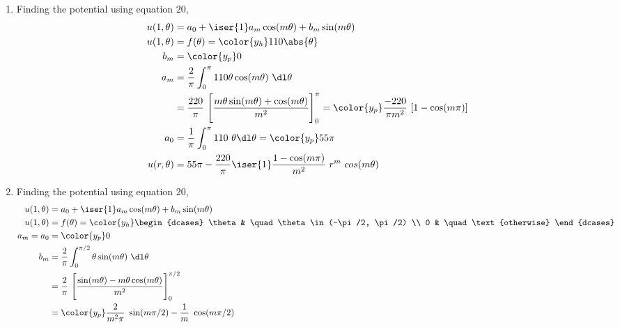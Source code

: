 \begin{enumerate}
    \item Finding the potential using equation $ 20 $,
          \begin{align}
              u(1, \theta) & = a_0 + \iser{1} a_m \cos(m\theta) + b_m \sin(m\theta)   \\
              u(1, \theta) & = f(\theta) = \color{y_h} 110\abs{\theta}                \\
              b_m          & = \color{y_p} 0                                          \\
              a_m          & = \frac{2}{\pi} \int_{0}^{\pi} 110 \theta \cos(m\theta)
              \ \dl \theta                                                            \\
                           & = \frac{220}{\pi}\ \Bigg[ \frac{m\theta \sin(m\theta)
                      + \cos(m\theta)}{m^2} \Bigg]_{0}^{\pi}
              = \color{y_p} \frac{-220}{\pi m^2}\ [1 - \cos(m\pi)]                    \\
              a_0          & = \frac{1}{\pi} \int_{0}^{\pi} 110\ \theta \dl \theta
              = \color{y_p} 55 \pi                                                    \\
              u(r, \theta) & = 55\pi - \frac{220}{\pi} \iser{1} \frac{1 - \cos(m\pi)}
              {m^2}\ r^m\ cos(m\theta)
          \end{align}

    \item Finding the potential using equation $ 20 $,
          \begin{align}
              u(1, \theta) & = a_0 + \iser{1} a_m \cos(m\theta) + b_m \sin(m\theta) \\
              u(1, \theta) & = f(\theta) = \color{y_h}
              \begin{dcases}
                  \theta & \quad \theta \in (-\pi/2, \pi/2) \\
                  0      & \quad \text{otherwise}
              \end{dcases}                             \\
              a_m = a_0    & = \color{y_p} 0                                        \\
              b_m          & = \frac{2}{\pi} \int_{0}^{\pi/2} \theta \sin(m\theta)
              \ \dl \theta                                                          \\
                           & = \frac{2}{\pi}\ \Bigg[ \frac{\sin(m\theta) -
              m\theta \cos(m\theta)}{m^2} \Bigg]_{0}^{\pi/2}                        \\
                           & = \color{y_p} \frac{2}{m^2\pi}\ \sin(m\pi/2)
              - \frac{1}{m}\ \cos(m\pi/2)
          \end{align}


\end{enumerate}
